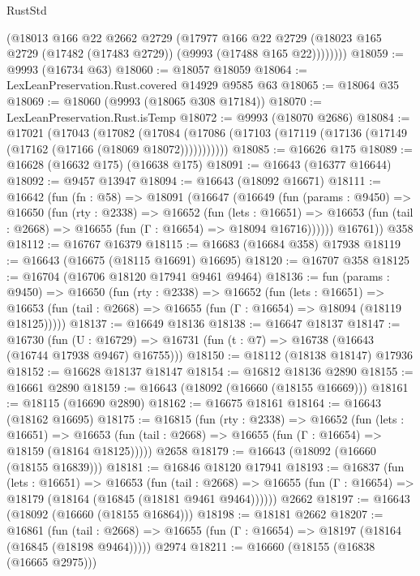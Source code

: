 \begin{lexlean}{RustStd}
\begin{coremodule}
          (@18013
            @166
            @22
            @2662
            @2729
            (@17977
              @166
              @22
              @2729
              (@18023 @165 @2729 (@17482 (@17483 @2729)) (@9993 (@17488 @165 @22))))))))
@18059 := @9993 (@16734 @63)
@18060 := @18057 @18059
@18064 := LexLeanPreservation.Rust.covered @14929 @9585 @63
@18065 := @18064 @35
@18069 := @18060 (@9993 (@18065 @308 @17184))
@18070 := LexLeanPreservation.Rust.isTemp
@18072 := @9993 (@18070 @2686)
@18084 := @17021
    (@17043
      (@17082
        (@17084 (@17086 (@17103 (@17119 (@17136 (@17149 (@17162 (@17166 (@18069 @18072)))))))))))
@18085 := @16626 @175
@18089 := @16628 (@16632 @175) (@16638 @175)
@18091 := @16643 (@16377 @16644)
@18092 := @9457 @13947
@18094 := @16643 (@18092 @16671)
@18111 := @16642
    (fun (fn : @58) =>
    @18091
      (@16647
        (@16649
          (fun (params : @9450) =>
          @16650
            (fun (rty : @2338) =>
            @16652
              (fun (lets : @16651) =>
              @16653 (fun (tail : @2668) => @16655 (fun (Γ : @16654) => @18094 @16716))))))
        @16761))
    @358
@18112 := @16767 @16379
@18115 := @16683 (@16684 @358) @17938
@18119 := @16643 (@16675 (@18115 @16691) @16695)
@18120 := @16707 @358
@18125 := @16704 (@16706 @18120 @17941 @9461 @9464)
@18136 := fun (params : @9450) =>
  @16650
    (fun (rty : @2338) =>
    @16652
      (fun (lets : @16651) =>
      @16653 (fun (tail : @2668) => @16655 (fun (Γ : @16654) => @18094 (@18119 @18125)))))
@18137 := @16649 @18136
@18138 := @16647 @18137
@18147 := @16730
    (fun (U : @16729) => @16731 (fun (t : @7) => @16738 (@16643 (@16744 @17938 @9467) @16755)))
@18150 := @18112 (@18138 @18147) @17936
@18152 := @16628 @18137 @18147
@18154 := @16812 @18136 @2890
@18155 := @16661 @2890
@18159 := @16643 (@18092 (@16660 (@18155 @16669)))
@18161 := @18115 (@16690 @2890)
@18162 := @16675 @18161
@18164 := @16643 (@18162 @16695)
@18175 := @16815
    (fun (rty : @2338) =>
    @16652
      (fun (lets : @16651) =>
      @16653 (fun (tail : @2668) => @16655 (fun (Γ : @16654) => @18159 (@18164 @18125)))))
    @2658
@18179 := @16643 (@18092 (@16660 (@18155 @16839)))
@18181 := @16846 @18120 @17941
@18193 := @16837
    (fun (lets : @16651) =>
    @16653
      (fun (tail : @2668) =>
      @16655 (fun (Γ : @16654) => @18179 (@18164 (@16845 (@18181 @9461 @9464))))))
    @2662
@18197 := @16643 (@18092 (@16660 (@18155 @16864)))
@18198 := @18181 @2662
@18207 := @16861
    (fun (tail : @2668) => @16655 (fun (Γ : @16654) => @18197 (@18164 (@16845 (@18198 @9464)))))
    @2974
@18211 := @16660 (@18155 (@16838 (@16665 @2975)))

\end{coremodule}
\end{lexlean}
